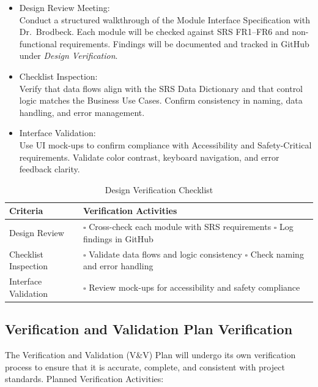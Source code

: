\documentclass[12pt, titlepage]{article}
\begin{document}
\begin{itemize}
    \item Design Review Meeting: \\
    Conduct a structured walkthrough of the Module Interface Specification with Dr.~Brodbeck. Each module will be checked against SRS FR1--FR6 and non-functional requirements. Findings will be documented and tracked in GitHub under \textit{Design Verification}.
    
    \item Checklist Inspection: \\
    Verify that data flows align with the SRS Data Dictionary and that control logic matches the Business Use Cases. Confirm consistency in naming, data handling, and error management.
    
    \item Interface Validation: \\
    Use UI mock-ups to confirm compliance with Accessibility and Safety-Critical requirements. Validate color contrast, keyboard navigation, and error feedback clarity.
\end{itemize}

\begin{table}[H]
\centering
\caption{Design Verification Checklist}
\renewcommand{\arraystretch}{1.3}
\begin{tabular}{|p{5cm}|p{9cm}|}
\hline
Criteria & Verification Activities \\ \hline
Design Review &
\(\square\) Cross-check each module with SRS requirements \newline
\(\square\) Log findings in GitHub \\ \hline
Checklist Inspection &
\(\square\) Validate data flows and logic consistency \newline
\(\square\) Check naming and error handling \\ \hline
Interface Validation &
\(\square\) Review mock-ups for accessibility and safety compliance \\ \hline
\end{tabular}
\end{table}

\subsection{Verification and Validation Plan Verification}

The Verification and Validation (V\&V) Plan will undergo its own verification process to ensure that it is accurate, complete, and consistent with project standards. Planned Verification Activities:
\end{document}
